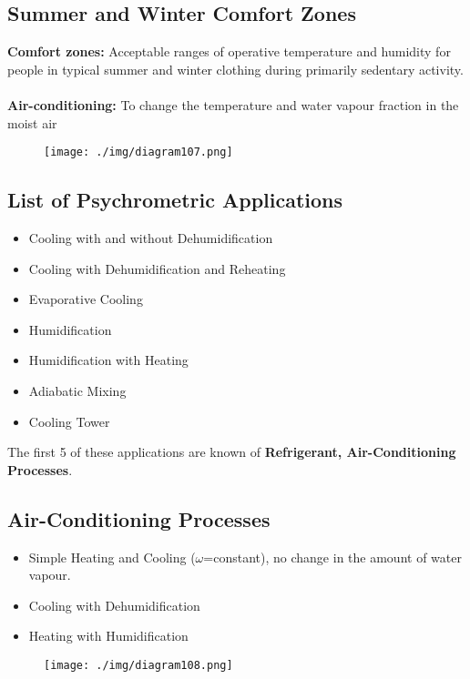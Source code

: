 \subsection{Summer and Winter Comfort Zones}
\textbf{Comfort zones:} Acceptable ranges of operative temperature and humidity for people in typical summer and winter clothing during primarily sedentary activity. \\\\
\textbf{Air-conditioning:} To change the temperature and water vapour fraction in the moist air
\begin{figure}[H]
  \centering
  \texttt{[image: ./img/diagram107.png]}
  \caption{}
\end{figure}
\subsection{List of Psychrometric Applications}
\begin{itemize}[noitemsep]
  \item Cooling with and without Dehumidification
  \item Cooling with Dehumidification and Reheating
  \item Evaporative Cooling
  \item Humidification
  \item Humidification with Heating
  \item Adiabatic Mixing
  \item Cooling Tower
\end{itemize}
The first 5 of these applications are known of \textbf{Refrigerant, Air-Conditioning Processes}.
\subsection{Air-Conditioning Processes}
\begin{itemize}[noitemsep]
  \item Simple Heating and Cooling ($\omega$=constant), no change in the amount of water vapour.
  \item Cooling with Dehumidification
  \item Heating with Humidification
\end{itemize}
\begin{figure}[H]
  \centering
  \texttt{[image: ./img/diagram108.png]}
  \caption{}
\end{figure}

